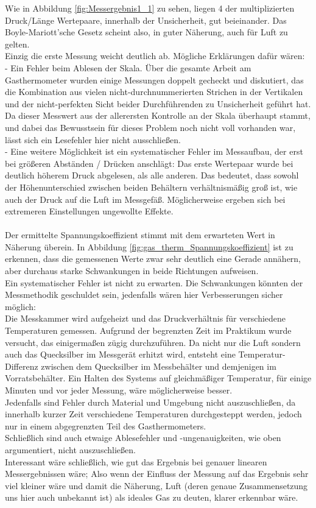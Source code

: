 \documentclass[12pt,a4paper]{article}
\begin{document}
\begin{multicols}{2}
Wie in Abbildung \ref{fig:Messergebnis1_1} zu sehen, liegen 4 der multiplizierten Druck/Länge Wertepaare, innerhalb der Unsicherheit, gut beieinander. Das Boyle-Mariott'sche Gesetz scheint also, in guter Näherung, auch für Luft zu gelten.\\
Einzig die erste Messung weicht deutlich ab. Mögliche Erklärungen dafür wären:\\
\indent - Ein Fehler beim Ablesen der Skala. Über die gesamte Arbeit am Gasthermometer wurden einige Messungen doppelt gecheckt und diskutiert, das die Kombination aus vielen nicht-durchnummerierten Strichen in der Vertikalen und der nicht-perfekten Sicht beider Durchführenden zu Unsicherheit geführt hat.\\
Da dieser Messwert aus der allerersten Kontrolle an der Skala überhaupt stammt, und dabei das Bewusstsein für dieses Problem noch nicht voll vorhanden war,  lässt sich ein Lesefehler hier nicht ausschließen.\\
\indent - Eine weitere Möglichkeit ist ein systematischer Fehler im Messaufbau, der erst bei größeren Abständen / Drücken anschlägt: Das erste Wertepaar wurde bei deutlich höherem Druck abgelesen, als alle anderen. Das bedeutet, dass sowohl der Höhenunterschied zwischen beiden Behältern verhältnismäßig groß ist, wie auch der Druck auf die Luft im Messgefäß. Möglicherweise ergeben sich bei extremeren Einstellungen ungewollte Effekte.\\
\\
Der ermittelte Spannungskoeffizient stimmt mit dem erwarteten Wert in Näherung überein. In Abbildung \ref{fig:gas_therm_Spannungskoeffizient} ist zu erkennen, dass die gemessenen Werte zwar sehr deutlich eine Gerade annähern, aber durchaus starke Schwankungen in beide Richtungen aufweisen.\\
Ein systematischer Fehler ist nicht zu erwarten. Die Schwankungen könnten der Messmethodik geschuldet sein, jedenfalls wären hier Verbesserungen sicher möglich:\\
Die Messkammer wird aufgeheizt und das Druckverhältnis für verschiedene Temperaturen gemessen. Aufgrund der begrenzten Zeit im Praktikum wurde versucht, das einigermaßen zügig durchzuführen. Da nicht nur die Luft sondern auch das Quecksilber im Messgerät erhitzt wird, entsteht eine Temperatur-Differenz zwischen dem Quecksilber im Messbehälter und demjenigen im Vorratsbehälter. Ein Halten des Systems auf gleichmäßiger Temperatur, für einige Minuten und vor jeder Messung, wäre möglicherweise besser.\\
Jedenfalls sind Fehler durch Material und Umgebung nicht auszuschließen, da innerhalb kurzer Zeit verschiedene Temperaturen durchgesteppt werden, jedoch nur in einem abgegrenzten Teil des Gasthermometers.\\
Schließlich sind auch etwaige Ablesefehler und -ungenauigkeiten, wie oben argumentiert, nicht auszuschließen.\\
Interessant wäre schließlich, wie gut das Ergebnis bei genauer linearen Messergebnissen wäre; Also wenn der Einfluss der Messung auf das Ergebnis sehr viel kleiner wäre und damit die Näherung, Luft (deren genaue Zusammensetzung uns hier auch unbekannt ist) als ideales Gas zu deuten, klarer erkennbar wäre.


\end{multicols}
\end{document}
